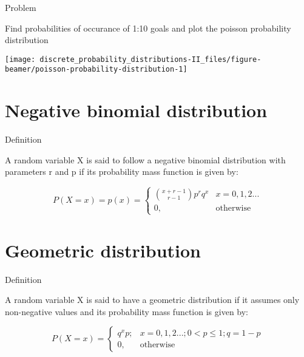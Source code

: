 \documentclass[ignorenonframetext,aspectratio=169]{beamer}
\begin{document}
\begin{frame}{Problem}
\protect\hypertarget{problem}{}

Find probabilities of occurance of 1:10 goals and plot the poisson
probability distribution

\begin{center}\texttt{[image: discrete\_probability\_distributions-II\_files/figure-beamer/poisson-probability-distribution-1]} \end{center}

\end{frame}

\hypertarget{negative-binomial-distribution}{%
\section{Negative binomial
distribution}\label{negative-binomial-distribution}}

\begin{frame}{Definition}
\protect\hypertarget{definition-1}{}

A random variable X is said to follow a negative binomial distribution
with parameters r and p if its probability mass function is given by:

\[
P(X = x) = p(x) =
\begin{cases}
\binom{x + r -1}{r -1}p^r q^x & x = 0, 1, 2...\\
0, & \text{otherwise}
\end{cases}
\]

\end{frame}

\hypertarget{geometric-distribution}{%
\section{Geometric distribution}\label{geometric-distribution}}

\begin{frame}{Definition}
\protect\hypertarget{definition-2}{}

A random variable X is said to have a geometric distribution if it
assumes only non-negative values and its probability mass function is
given by:

\[
P(X = x) =
\begin{cases}
q^x p;  & x = 0, 1, 2...; 0 < p \leq 1; q = 1-p \\
0, & \text{otherwise}
\end{cases}
\]

\end{frame}
\end{document}
